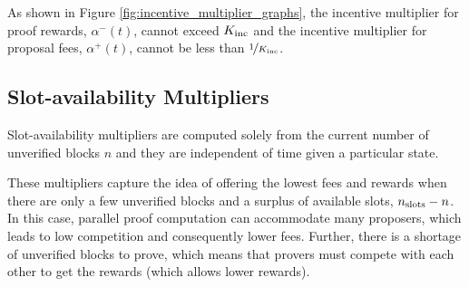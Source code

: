 \documentclass[9pt,oneside]{amsart}
\begin{document}
\begin{multicols}{2}
As shown in Figure \ref{fig:incentive_multiplier_graphs}, the incentive multiplier for proof rewards, $\alpha^-(t)$, cannot exceed $K_\textnormal{inc}$ and the incentive multiplier for proposal fees, $\alpha^+(t)$, cannot be less than $\nicefrac{1}{K_\textnormal{inc}}$.

\subsection{Slot-availability Multipliers}
\label{sec:slot_availability_multipliers}
Slot-availability multipliers are computed solely from the current number of unverified blocks $n$ and they are independent of time given a particular state. 

These multipliers capture the idea of offering the lowest fees and rewards when there are only a few unverified blocks and a surplus of available slots, $n_\textnormal{slots}-n$. In this case, parallel proof computation can accommodate many proposers, which leads to low competition and consequently lower fees. Further, there is a shortage of unverified blocks to prove, which means that provers must compete with each other to get the rewards (which allows lower rewards). 


\end{multicols}
\end{document}
